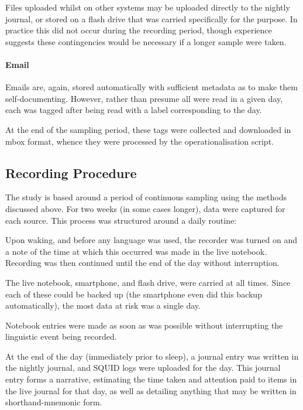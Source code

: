 Files uploaded whilst on other systems may be uploaded directly to the nightly journal, or stored on a flash drive that was carried specifically for the purpose.  In practice this did not occur during the recording period, though experience suggests these contingencies would be necessary if a longer sample were taken.

\paragraph{Email}
Emails are, again, stored automatically with sufficient metadata as to make them self-documenting.  However, rather than presume all were read in a given day, each was tagged after being read with a label corresponding to the day.

At the end of the sampling period, these tags were collected and downloaded in mbox format, whence they were processed by the operationalisation script.









\subsection{Recording Procedure}
\label{sec:personal:method:recording}
The study is based around a period of continuous sampling using the methods discussed above.  For two weeks (in some cases longer), data were captured for each source.  This process was structured around a daily routine:

Upon waking, and before any language was used, the recorder was turned on and a note of the time at which this occurred was made in the live notebook.  Recording was then continued until the end of the day without interruption.

The live notebook, smartphone, and flash drive, were carried at all times.  Since each of these could be backed up (the smartphone even did this backup automatically), the most data at risk was a single day.

Notebook entries were made as soon as was possible without interrupting the linguistic event being recorded.

At the end of the day (immediately prior to sleep), a journal entry was written in the nightly journal, and SQUID logs were uploaded for the day.  This journal entry forms a narrative, estimating the time taken and attention paid to items in the live journal for that day, as well as detailing anything that may be written in shorthand-mnemonic form.










